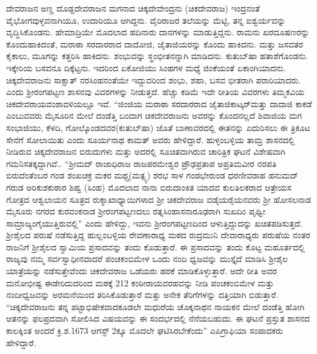 ದೇವರಾಜನ ಅಣ್ಣ ದೊಡ್ಡದೇವರಾಜನ ಮಗನಾದ ಚಿಕ್ಕದೇವೇಂದ್ರನು (ಚಿಕದೇವರಾಜ) ಇಂದ್ರನಂತೆ ವೈಭೋಗವುಳ್ಳವ\-ನಾಗಿಯೂ, ಉದಾರಿಯೂ ಆಗಿದ್ದನು. ವೈರಿರಾಜರ ತಲೆಯನ್ನು ಮೆಟ್ಟಿ, ತನ್ನ ಐಶ್ವರ್ಯವನ್ನು ವೃದ್ಧಿಸಿಕೊಂಡನು. ಹೇಮಾದ್ರಿಯೇ ಮೊದಲಾದ ಹದಿನಾರು ದಾನಗಳನ್ನು ಮಾಡುತ್ತಿದ್ದನು. ರಾಮನು ಖರದೂಷಣರನ್ನು ಕೊಂದುಹಾಕಿದಂತೆ, ಮರಾಠಾ ಸರದಾರರಾದ ದಾದೋಜಿ, ಜೈತಾಜಿಯರನ್ನು ಕೊಂದು ಹಾಕಿದನು. ಮತ್ತು ಜಸವತರ ಕೈಕಾಲು, ಮೂಗನ್ನು ಕತ್ತರಿಸಿ ಹಾಕಿದನು. ಶಂಭುವನ್ನು ಸ್ಥಂಭೀತನನ್ನಾಗಿ ಮಾಡಿದನು. ಕುತುಬ್​ಷಾ ಹತಾಶೆಗೊಂಡನು. ಇಕ್ಕೇರಿಯ ಬಸವನೂ ದಿಕ್ಕೆಟ್ಟನು. ಇದರಿಂದ ಏಕೋಜಿಯು ಸಿಂಹಗಳ ಮಧ್ಯೆ ಜಿಂಕೆಯಂತೆ ಏಕಾಂಗಿಯಾದನು. ಚಿಕ್ಕದೇವರಾಜನು ಸಾಕ್ಷಾತ್​ ನರಸಿಂಹನಂತೆಯೇ ಇದ್ದುದರಿಂದ ಶಂಭು, ಶಹಾ, ಬಸವ ಭೀತರಾಗಿ ಪರಾರಿಯಾದರು. ಎಂದು ಶ‍್ರೀರಂಗಪಟ್ಟಣ ಶಾಸನವು ವಿವರಗಳನ್ನು ನೀಡುತ್ತದೆ. ಹೆಚ್ಚು ಕಡಿಮೆ ಇದೇ ರೀತಿಯ ವಿವರಗಳು ತಿಮ್ಮಕವಿಯ ಚಿಕದೇವರಾಯವಂಶಾವಳಿಯಲ್ಲೂ ಇವೆ. “ಜಿಂಜಿಯ ಮರಾಠಾ ಸರದಾರರಾದ ಜೈತಾಜಿಕಾಟ್ಕರ್​ ಮತ್ತು ದಾದಾಜಿ ಕಾಕಡೆ ಎಂಬುವವರು ಮೈಸೂರಿನ ಮೇಲೆ ದಂಡೆತ್ತಿ ಬಂದಾಗ ಚಿಕದೇವರಾಜನು ಅವರನ್ನು ಕೊಂದನಲ್ಲದೆ ಶಿವಾಜಿಯ ಮಗ ಸಂಭಾಜಿಯು, ಕೆಳದಿ, ಗೋಲ್ಕೊಂಡದವರ\break (ಕುತುಬ್​ಷಾ) ಜೊತೆ ಬಾಣಾವರದಲ್ಲಿ ಈತನನ್ನು ಎದುರಿಸಲು ಈ ತ್ರಿಕೂಟ ಸೇನೆಗೆ ಸೋಲಾಯಿತು ಎಂದು ಸೂರ್ಯನಾಥ ಕಾಮತ್​ ಅವರು ಹೇಳಿದ್ದಾರೆ. ಹುಳ್ಳಂಬಳ್ಳಿಯ ತಾಮ್ರ ಶಾಸನದಲ್ಲಿ ನೀಡಿರುವ ಚಿಕ್ಕದೇವರಾಜನ ಬಿರುದುಗಳು ಮತ್ತು ಅದರಲ್ಲಿ ಸೂಚಿತವಾಗಿರುವ ಚಾರಿತ್ರಿಕ ಘಟನೆ ವಿಶೇಷವಾಗಿ ಗಮನಿಸತಕ್ಕದ್ದಾಗಿವೆ.. “ಶ‍್ರೀಮದ್​ ರಾಜಾಧಿರಾಜ ರಾಜಪರಮೇಶ್ವರ ಪ್ರೌಢಪ್ರತಾಪ ಅಪ್ರತಿಮವೀರ ನರಪತಿ ಬಿರುದೆಂತೆಂಬರ ಗಂಡ ಶಂಖಚಕ್ರ ಮಕರ ಮಥ್ಚ(ಮತ್ಸ್ಯ) ಶರಭ ಸಾಳ ಗಂಡಭೇರುಂಡ ಧರಣೀವರಾಹ ಹನುಮದ್​ಗರುಡ ಅರಿಕುಶಕುಠಾರ ಶಿಹ್ವ (ಸಿಂಹ) ಮೊದಲಾದ ನಾನಾ ಬಿರುದಾಂಕಿತ ಯಾದವ ಕುಲತಿಲಕರಾದ ಆತ್ರೇಯಸ ಗೋತ್ರದ ಆಶ್ವಲಾಯನ ಸೂತ್ರದ ರುಕ್ಶಾಖಾಧ್ಯಾಯಿಗಳಾದ ಶ‍್ರೀ ಚಿಕದೇವರಾಜ ವಡೈಯರೈಯನವರು ಶ‍್ರೀ ಹೋಸಲನಾಡ ಮೈಸೂರು ನಗರದ ಕುರವಂಕನಾಡ ಶ‍್ರೀರಂಗಪಟ್ಟಣದಲು ರತ್ನಸಿಂಹಾಸನಾರೂಢರಾಗಿ ಸುಖದಿಂ ಪೃಥ್ವೀ ಸಾಮ್ರಾಜ್ಯಂಗೈಯುತ್ತಿರುವಲ್ಲಿ” ಎಂದು ಹೇಳಿದ್ದು, ಇವನು ಶ‍್ರೀರಂಗಪಟ್ಟಣದಿಂದ ಆಳುತ್ತಿದ್ದುದನ್ನು ಖಚಿತಪಡಿಸುತ್ತದೆ. ಶ‍್ರೀಶೈಲದ ಪರುಷೆ ನಡೆಸುತ್ತಿದ್ದ ಹುಲ್ಲಂಬಳ್ಳಿಯ ರೇವಣಾರಾಧ್ಯ ಮಠದ ರುದ್ರಮುನಿ ದೇವಾರಾಧ್ಯರು ಪರುಷೆಯ ನಂತರ ರಾಜನಿಗೆ ಶ‍್ರೀಶೈಲದ ಸ್ವಾಮಿಯ ಪ್ರಸಾದವನ್ನು ತಂದು ಕೊಡುತ್ತಾರೆ. ಈ ಪ್ರಸಾದವನ್ನು ತಂದು ಕೊಟ್ಟ ಮಹೂರ್ತದಲ್ಲಿ ರಾಜ್ಯವು ನಮ್ಮ ಸರ್ವಸ್ವಾಧೀನವಾದರೆ ಪಂಚಕಂಬಿಮೇಳ ಒಂದು ನಂದಿ ಧ್ವಜವನ್ನು ಮುಸ್ತೈದೆ ಮಾಡಿಸಿ ಶ‍್ರೀಶೈಲ ಯಾತ್ರೆಯನ್ನು ನಡೆಸುತ್ತೇವೆಂದು ಚಿಕದೇವರಾಜ ಒಡೆಯರು ಹರಕೆ ಮಾಡಿಕೊಳ್ಳುತ್ತಾರೆ. ಅದೇ ರೀತಿ ಅವರ ಮನೋಭೀಷ್ಟ ಈಡೇರಿದುದರಿಂದ ಮಠಕ್ಕೆ 212 ಕಂಠೀರಾಯವರಹವನ್ನು ನೀಡಿ ಪಂಚಕಂಬಿಮೇಳ ಮತ್ತು ನಂದೀಧ್ವಜವನ್ನು ಅರಮನೆಯಿಂದ ತರಿಸಿಕೊಡುತ್ತಾರೆ ಮತ್ತು ಅನೇಕ ತೆರಿಗೆಗಳನ್ನು ದತ್ತಿಯಾಗಿ ಬಿಡುತ್ತಾರೆ. “ಚಿಕ್ಕದೇವರಾಜನು ತನ್ನ ಪಟ್ಟಾಭಿಷೇಕವಾದಕೂಡಲೇ ಮಧುರೆಯ ಚೊಕ್ಕನಾಥನ ನಾಯಕನ ಮೇಲೆ ದಂಡೆತ್ತಿ ಹೋಗಿ ಆತನನ್ನು ಫಲಪ್ರದವಾಗಿ ಸೋಲಿಸಿದ ವಿಷಯವನ್ನು ಈ ಸಂದರ್ಭದಲ್ಲಿ ನೆನೆಯಬಹುದು. ಈ ಘಟನೆ ಪ್ರಸ್ತುತ ಶಾಸನದ ಕಾಲಕ್ಕಿಂತ ಅಂದರೆ ಕ್ರಿ.ಶ.1673 ಆಗಸ್ಟ್​ 2ಕ್ಕೂ ಮೊದಲೇ ಘಟಿಸಿರಬೇಕೆಂದು” ಎಪಿಗ್ರಾಫಿಯಾ ಸಂಪಾದಕರು ಹೇಳಿದ್ದಾರೆ. 

